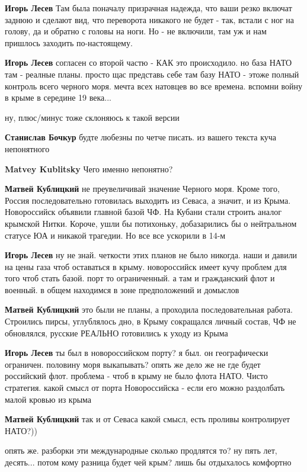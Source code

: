 \begin{itemize}
\begin{itemize}
\textbf{Игорь Лесев} Там была поначалу призрачная надежда, что ваши резко включат заднюю и сделают вид, что переворота никакого не будет - так, встали с ног на голову, да и обратно с головы на ноги. Но - не включили, там уж и нам пришлось заходить по-настоящему.

\textbf{Игорь Лесев} согласен со второй частю - КАК это происходило. но база НАТО там - реалные планы. просто щас представь себе там базу НАТО - этоже полный контроль всего черного моря. мечта всех натовцев во все времена. вспомни войну в крыме в середине 19 века...

ну, плюс/минус тоже склоняюсь к такой версии

\textbf{Станислав Бочкур} будте любезны по четче писать. из вашего текста куча непонятного

\textbf{Matvey Kublitsky} Чего именно непонятно?

\textbf{Матвей Кублицкий} не преувеличивай значение Черного моря. Кроме того, Россия последовательно готовилась выходить из Севаса, а значит, и из Крыма. Новороссийск объявили главной базой ЧФ. На Кубани стали строить аналог крымской Нитки. Короче, ушли бы потихоньку, добазарились бы о нейтральном статусе ЮА и никакой трагедии. Но все все ускорили в 14-м

\textbf{Игорь Лесев} ну не знай. четкости этих планов не было никогда. наши и давили на цены газа чтоб оставаться в крыму. новороссийск имеет кучу проблем для того чтоб стать базой. порт то ограниченный. а там и гражданский флот и военный. в общем находимся в зоне предположений и домыслов

\textbf{Матвей Кублицкий} это были не планы, а проходила последовательная работа. Строились пирсы, углублялось дно, в Крыму сокращался личный состав, ЧФ не обновлялся, русские РЕАЛЬНО готовились к уходу из Крыма

\textbf{Игорь Лесев} ты был в новороссийском порту? я был. он географически ограничен. половину моря выкапывать? опять же дело же не где будет российский флот. проблема - чтоб в крыму не было флота НАТО. Чисто стратегия. какой смысл от порта Новороссийска - если его можно раздолбать малой кровью из крыма

\textbf{Матвей Кублицкий} так и от Севаса какой смысл, есть проливы контролирует НАТО?))

опять же. разборки эти международные сколько продлятся то? ну пять лет, десять... потом кому разница будет чей крым? лишь бы отдыхалось комфортно


\end{itemize}
\end{itemize}
